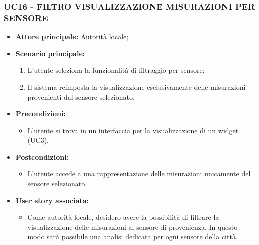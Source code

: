 \subsubsection{UC16 - FILTRO VISUALIZZAZIONE MISURAZIONI PER SENSORE}
\begin{itemize}
    \item \textbf{Attore principale:} Autorità locale;
    \item \textbf{Scenario principale:}
          \begin{enumerate}
              \item L'utente seleziona la funzionalità di filtraggio per sensore;
              \item Il sistema reimposta la visualizzazione esclusivamente delle misurazioni provenienti dal sensore selezionato.
          \end{enumerate}
    \item \textbf{Precondizioni:}
          \begin{itemize}
              \item  L'utente si trova in un interfaccia per la visualizzazione di un widget (UC3).
          \end{itemize}
    \item \textbf{Postcondizioni:}
          \begin{itemize}
              \item  L'utente accede a una rappresentazione delle misurazioni unicamente del sensore selezionato.
          \end{itemize}
    \item \textbf{User story associata:}
          \begin{itemize}
            \item Come autorità locale, desidero avere la possibilità di filtrare la visualizzazione delle misurazioni al sensore di provenienza. In questo modo sarà possibile una analisi dedicata per ogni sensore della città.
          \end{itemize}
\end{itemize}
